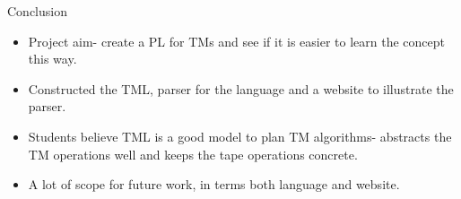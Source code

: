 \documentclass{beamer}
\begin{document}
    \begin{frame}{Conclusion}
        \begin{itemize}
            \item Project aim- create a PL for TMs and see if it is easier to learn the concept this way.
            \item Constructed the TML, parser for the language and a website to illustrate the parser.
            \item Students believe TML is a good model to plan TM algorithms- abstracts the TM operations well and keeps the tape operations concrete.
            \item A lot of scope for future work, in terms both language and website.
        \end{itemize}
    \end{frame}
    
\end{document}
